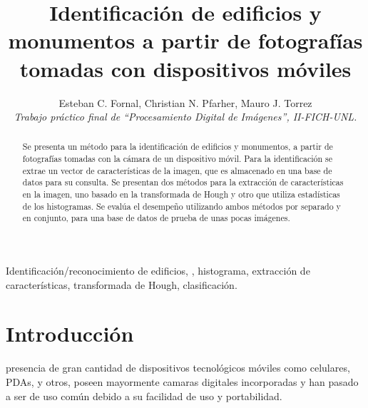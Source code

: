 \documentclass[conference,spanish,a4paper,10pt,oneside,final]{tfmpd}
\begin{document}
\title{Identificación de edificios y monumentos a partir de fotografías
tomadas con dispositivos móviles}
\author{Esteban C. Fornal, Christian N. Pfarher, Mauro J. Torrez\\
\textit{Trabajo práctico final de ``Procesamiento Digital de
Imágenes'', II-FICH-UNL.}}
\maketitle
%
%
%
%
\begin{abstract}
Se presenta un método para la identificación de edificios y monumentos, a
partir de fotografías tomadas con la cámara de un dispositivo móvil.
Para la identificación se extrae un vector de características de la imagen,
que es almacenado en una base de datos para su consulta.
Se presentan dos métodos para la extracción de características en la imagen, uno
basado en la transformada de Hough y otro que utiliza estadísticas de los
histogramas. Se evalúa el desempeño utilizando ambos métodos por separado y en
conjunto, para una base de datos de prueba de unas pocas imágenes.
\end{abstract}
%
%
%
%
\begin{keywords}
Identificación/reconocimiento de edificios, ,
histograma, extracción de características, transformada de Hough, clasificación.
\end{keywords}
%
%
%
%
\section{Introducción}
 presencia de gran cantidad de dispositivos tecnológicos móviles 
como celulares, PDAs, y otros, poseen mayormente camaras digitales incorporadas
y han pasado a ser de uso común debido a su facilidad de uso y portabilidad.
\end{document}
